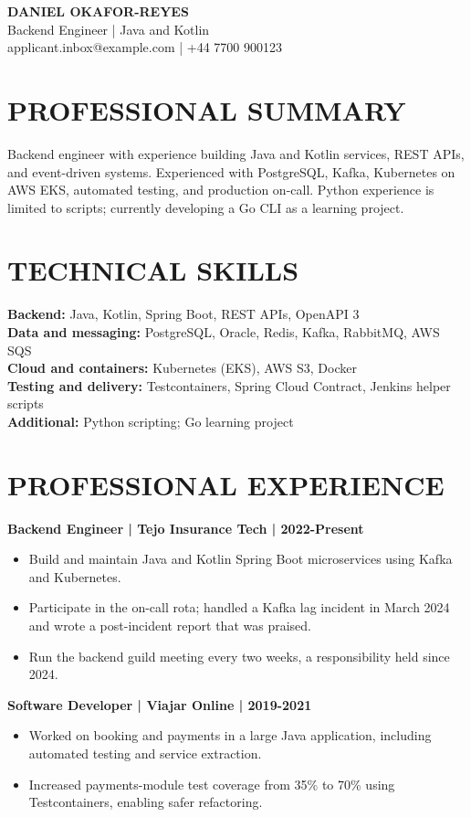 \documentclass[11pt,a4paper]{article}
\begin{document}
\begin{center}
{\Huge\bfseries\color{primarycolor} DANIEL OKAFOR-REYES}\\[0.35em]
{\large\color{accentcolor} Backend Engineer | Java and Kotlin}\\[0.25em]
applicant.inbox@example.com | +44 7700 900123
\end{center}

\section*{PROFESSIONAL SUMMARY}
Backend engineer with experience building Java and Kotlin services, REST APIs, and event-driven systems. Experienced with PostgreSQL, Kafka, Kubernetes on AWS EKS, automated testing, and production on-call. Python experience is limited to scripts; currently developing a Go CLI as a learning project.

\section*{TECHNICAL SKILLS}
\textbf{Backend:} Java, Kotlin, Spring Boot, REST APIs, OpenAPI 3\\
\textbf{Data and messaging:} PostgreSQL, Oracle, Redis, Kafka, RabbitMQ, AWS SQS\\
\textbf{Cloud and containers:} Kubernetes (EKS), AWS S3, Docker\\
\textbf{Testing and delivery:} Testcontainers, Spring Cloud Contract, Jenkins helper scripts\\
\textbf{Additional:} Python scripting; Go learning project

\section*{PROFESSIONAL EXPERIENCE}
\textbf{Backend Engineer | Tejo Insurance Tech | 2022-Present}
\begin{itemize}
\item Build and maintain Java and Kotlin Spring Boot microservices using Kafka and Kubernetes.
\item Participate in the on-call rota; handled a Kafka lag incident in March 2024 and wrote a post-incident report that was praised.
\item Run the backend guild meeting every two weeks, a responsibility held since 2024.
\end{itemize}

\textbf{Software Developer | Viajar Online | 2019-2021}
\begin{itemize}
\item Worked on booking and payments in a large Java application, including automated testing and service extraction.
\item Increased payments-module test coverage from 35\% to 70\% using Testcontainers, enabling safer refactoring.
\end{itemize}
\end{document}
